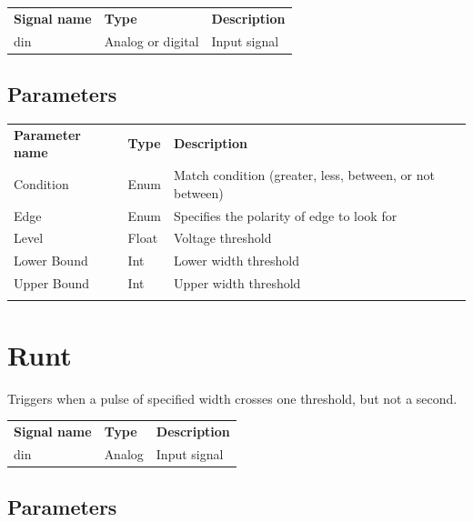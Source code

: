 \begin{tabularx}{16cm}{llX}
\thickhline
\textbf{Signal name} & \textbf{Type} & \textbf{Description} \\
\thickhline
din & Analog or digital & Input signal \\
\end{tabularx}

\subsection{Parameters}

\begin{tabularx}{16cm}{llX}
\thickhline
\textbf{Parameter name} & \textbf{Type} & \textbf{Description} \\
\thickhline
Condition & Enum & Match condition (greater, less, between, or not between) \\
\thickhline
Edge & Enum & Specifies the polarity of edge to look for\\
\thickhline
Level & Float & Voltage threshold\\
\thickhline
Lower Bound & Int & Lower width threshold\\
\thickhline
Upper Bound & Int & Upper width threshold\\
\thickhline
\end{tabularx}

\section{Runt}

Triggers when a pulse of specified width crosses one threshold, but not a second.

\begin{tabularx}{16cm}{llX}
\thickhline
\textbf{Signal name} & \textbf{Type} & \textbf{Description} \\
\thickhline
din & Analog & Input signal \\
\end{tabularx}

\subsection{Parameters}

